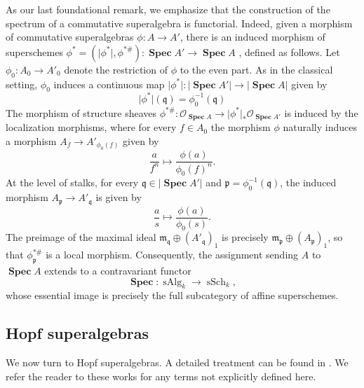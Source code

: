 \documentclass[11pt,a4paper,reqno,noamsfonts]{amsart}
\numberwithin{equation}{section}
\theoremstyle{definition}
\theoremstyle{remark}
\newcommand{\Ocal}{\ensuremath{\mathscr{O}}}
\newcommand{\mfrak}{\ensuremath{\mathfrak{m}}}
\newcommand{\pfrak}{\ensuremath{\mathfrak{p}}}
\newcommand{\qfrak}{\ensuremath{\mathfrak{q}}}
\DeclareMathOperator{\sSpec}{\mathbf{Spec}}
\DeclareMathOperator{\sAlg}{sAlg}
\DeclareMathOperator{\sSch}{sSch}
\begin{document}
As our last foundational remark, we emphasize that the construction of the spectrum of a commutative superalgebra is functorial. Indeed, given a morphism of commutative superalgebras $\phi \colon A\to A'$, there is an induced morphism of superschemes $\phi^{*} = (\lvert \phi^{*} \rvert, \phi^{* \#}) \colon \sSpec A'\to\sSpec A$ , defined as follows. Let $\phi_0\colon A_0\to A'_0$ denote the restriction of $\phi$ to the even part. As in the classical setting, $\phi_0$ induces a continuous map $\lvert \phi^{*} \rvert\colon\lvert\sSpec A'\rvert\to\lvert\sSpec A\rvert$ given by
\begin{equation}
\lvert \phi^{*} \rvert(\qfrak)=\phi_0^{-1}(\qfrak)
\end{equation}
The morphism of structure sheaves $\phi^{* \#}\colon\Ocal_{\sSpec A}\to\lvert\phi^*\rvert_*\Ocal_{\sSpec A'}$ is induced by the localization morphisms, where for every $f\in A_0$ the morphism $\phi$ naturally induces a morphism $A_f\to A'_{\phi_0(f)}$ given by
\begin{equation}
\frac{a}{f^n}\longmapsto\frac{\phi(a)}{\phi_0(f)^n}. 
\end{equation}
At the level of stalks, for every $\qfrak\in\lvert\sSpec A' \rvert$ and $\pfrak=\phi_0^{-1}(\qfrak)$, the induced morphism $A_{\pfrak}\to A'_{\qfrak}$ is given by
\begin{equation}
\frac{a}{s}\longmapsto\frac{\phi(a)}{\phi_0(s)}.
\end{equation}
The preimage of the maximal ideal $\mfrak_{\qfrak}\oplus(A'_{\qfrak})_1$ is precisely $\mfrak_{\pfrak}\oplus(A_{\pfrak})_1$, so that $\phi^{*\#}_{\pfrak}$ is a local morphism. Consequently, the assignment sending $A$ to $\sSpec A$ extends to a contravariant functor
\begin{equation}
\sSpec\colon\sAlg_k\longrightarrow\sSch_k,
\end{equation}
whose essential image is precisely the full subcategory of affine superschemes.

%
\subsection{Hopf superalgebras}
We now turn to Hopf superalgebras. A detailed treatment can be found in \cite{GouldZhangBracken1993,DongHuang2011,Westra2009}. We refer the reader to these works for any terms not explicitly defined here.
\end{document}
